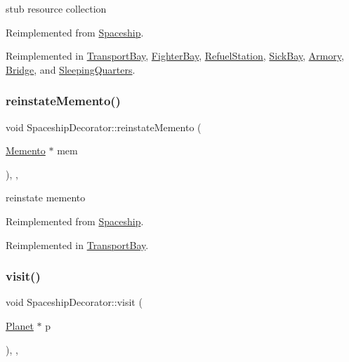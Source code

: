 stub resource collection 

Reimplemented from \hyperlink{classSpaceship_ad2027533de1d789db5e3efa22055f2d0}{Spaceship}.



Reimplemented in \hyperlink{classTransportBay_afac369115f4c17522a123f36be183e29}{Transport\+Bay}, \hyperlink{classFighterBay_ae6071df768f59aeeab67f7b2bb1cce52}{Fighter\+Bay}, \hyperlink{classRefuelStation_a69c7e7aca14ba70f4d2c4c11e43b4bb4}{Refuel\+Station}, \hyperlink{classSickBay_ab14fde02df1e95c352ba51d59480c3fa}{Sick\+Bay}, \hyperlink{classArmory_a06bba21799ef0b2a9f835632411420a4}{Armory}, \hyperlink{classBridge_a1508c1c9cfb44850fea31afcb7f1e403}{Bridge}, and \hyperlink{classSleepingQuarters_aa1c2a40c05a566955965dee8118dc410}{Sleeping\+Quarters}.

\mbox{\label{classSpaceshipDecorator_ac043134e491d99a8e0d985d7ce409a87}} 
\subsubsection{\texorpdfstring{reinstate\+Memento()}{reinstateMemento()}}
{\footnotesize\ttfamily void Spaceship\+Decorator\+::reinstate\+Memento (\begin{DoxyParamCaption}\item[{\hyperlink{classMemento}{Memento} $\ast$}]{mem }\end{DoxyParamCaption})\hspace{0.3cm}{\ttfamily [inline]}, {\ttfamily [protected]}, {\ttfamily [virtual]}}

reinstate memento 

Reimplemented from \hyperlink{classSpaceship_ab075c869473344b6471c8e28ca7ea61e}{Spaceship}.



Reimplemented in \hyperlink{classTransportBay_a501256401b6845a16ced9ea65c294f70}{Transport\+Bay}.

\mbox{\label{classSpaceshipDecorator_ae11d728646b22a33ce5bb465c23bab32}} 
\subsubsection{\texorpdfstring{visit()}{visit()}}
{\footnotesize\ttfamily void Spaceship\+Decorator\+::visit (\begin{DoxyParamCaption}\item[{\hyperlink{classPlanet}{Planet} $\ast$}]{p }\end{DoxyParamCaption})\hspace{0.3cm}{\ttfamily [inline]}, {\ttfamily [protected]}, {\ttfamily [virtual]}}

